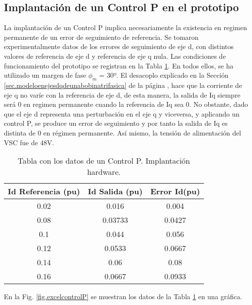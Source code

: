 \documentclass{report}
\begin{document}
\clearpage

\subsection{Implantación de un Control P en el prototipo} \label{sec.implantacioncontrolP}

La implantación de un Control P implica necesariamente la existencia en regimen permanente de un error de seguimiento de referencia. Se tomaron experimentalmente datos de los errores de seguimiento de eje d, con distintos valores de referencia de eje d y referencia de eje q nula. Las condiciones de funcionamiento del prototipo se registran en la Tabla \ref{tab.datosimplantacioncontrolP}. En todos ellos, se ha utilizado un margen de fase $\phi_{m}$ = 30º. El desacoplo explicado en la Sección \ref{sec.modeloenejesdqdeunabobinatrifasica} de la página \pageref{sec.modeloenejesdqdeunabobinatrifasica}, hace que la corriente de eje q no varíe con la referencia de eje d, de esta manera, la salida de Iq siempre será 0 en regimen permanente cuando la referencia de Iq sea 0. No obstante, dado que el eje d representa una perturbación en el eje q y viceversa, y aplicando un control P, se produce un error de seguimiento y por tanto la salida de Iq es distinta de 0 en régimen permanente. Así mismo, la tensión de alimentación del VSC fue de 48V.

\begin{table}[!h]
    \begin{center}
    \begin{tabular}{|c|c|c|} \hline\hline\hline
    \textbf{Id Referencia (pu)} & \textbf{Id Salida (pu)} & \textbf{Error Id(pu)} \\ \hline
    0.02 & 0.016 & 0.004 \\ \hline
    0.08&  0.03733 & 0.0427\\ \hline   
    0.1 & 0.044 & 0.056\\ \hline
    0.12 & 0.0533 & 0.0667\\ \hline 
    0.14 & 0.06 & 0.08\\ \hline 
    0.16 & 0.0667 & 0.0933\\ \hline 

    \end{tabular}
    \end{center}
    \caption{Tabla con los datos de un Control P. Implantación hardware.} \label{tab.datosimplantacioncontrolP}
\end{table}

En la Fig. \ref{fig.excelcontrolP} se muestran los datos de la Tabla \ref{tab.datosimplantacioncontrolP} en una gráfica.
\end{document}
